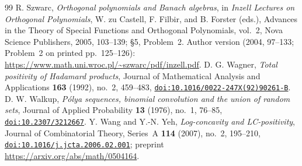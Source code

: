 \begin{thebibliography}{99}
 R. Szwarc, \emph{Orthogonal polynomials and Banach algebras}, in \emph{Inzell Lectures on Orthogonal Polynomials}, W. zu Castell, F. Filbir, and B. Forster (eds.), Advances in the Theory of Special Functions and Orthogonal Polynomials, vol.~2, Nova Science Publishers, 2005, 103--139; \S5, Problem~2. Author version (2004, 97--133; Problem~2 on printed pp.~125--126): \url{https://www.math.uni.wroc.pl/~szwarc/pdf/inzell.pdf}.
 D. G. Wagner, \emph{Total positivity of Hadamard products}, Journal of Mathematical Analysis and Applications \textbf{163} (1992), no.~2, 459--483, \href{https://doi.org/10.1016/0022-247X(92)90261-B}{\nolinkurl{doi:10.1016/0022-247X(92)90261-B}}.
 D. W. Walkup, \emph{Pólya sequences, binomial convolution and the union of random sets}, Journal of Applied Probability \textbf{13} (1976), no.~1, 76--85, \href{https://doi.org/10.2307/3212667}{\nolinkurl{doi:10.2307/3212667}}.
 Y. Wang and Y.-N. Yeh, \emph{Log-concavity and LC-positivity}, Journal of Combinatorial Theory, Series~A \textbf{114} (2007), no.~2, 195--210, \href{https://doi.org/10.1016/j.jcta.2006.02.001}{\nolinkurl{doi:10.1016/j.jcta.2006.02.001}}; preprint \url{https://arxiv.org/abs/math/0504164}.
\end{thebibliography}

